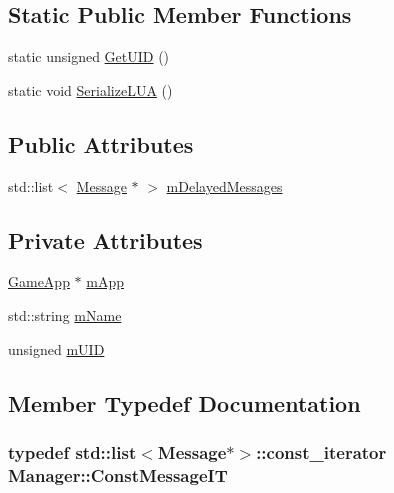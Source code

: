 \subsection*{Static Public Member Functions}
\begin{DoxyCompactItemize}
\item 
static unsigned \hyperlink{classManager_aa03cb6e60ebd782e3a5e165854c5172d}{Get\+U\+ID} ()
\item 
static void \hyperlink{classManager_ac9cf13655fb8aeb04a95bc02c76d22ba}{Serialize\+L\+UA} ()
\end{DoxyCompactItemize}
\subsection*{Public Attributes}
\begin{DoxyCompactItemize}
\item 
std\+::list$<$ \hyperlink{classMessage}{Message} $\ast$ $>$ \hyperlink{classManager_a2bc4fe3e13417022d2a12249dd4997eb}{m\+Delayed\+Messages}
\end{DoxyCompactItemize}
\subsection*{Private Attributes}
\begin{DoxyCompactItemize}
\item 
\hyperlink{classGameApp}{Game\+App} $\ast$ \hyperlink{classManager_a36229c6d248b1d9db13c463e0fe3cb57}{m\+App}
\item 
std\+::string \hyperlink{classManager_a126bbe95ad1a955a50d79560c3a01c4f}{m\+Name}
\item 
unsigned \hyperlink{classManager_ab1385f905d790384d4b9282c82153548}{m\+U\+ID}
\end{DoxyCompactItemize}


\subsection{Member Typedef Documentation}
\subsubsection[{\texorpdfstring{Const\+Message\+IT}{ConstMessageIT}}]{\setlength{\rightskip}{0pt plus 5cm}typedef std\+::list$<${\bf Message}$\ast$$>$\+::const\+\_\+iterator {\bf Manager\+::\+Const\+Message\+IT}}\hypertarget{classManager_aef9931b456639fc47d53241aac0a359c}{}\label{classManager_aef9931b456639fc47d53241aac0a359c}
